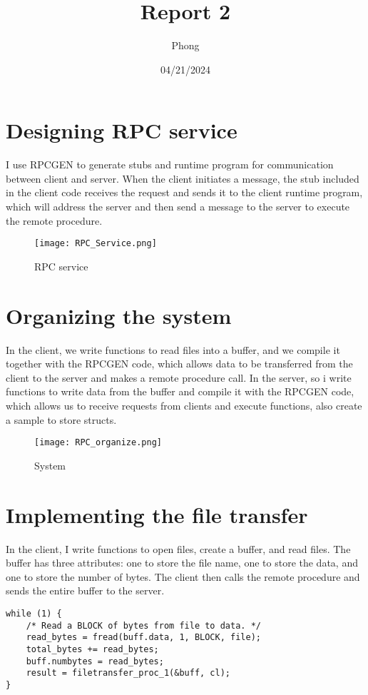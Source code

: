 \documentclass[12pt]{article}
\title{Report 2}
\author{Phong}
\date{04/21/2024}
\begin{document}
\maketitle

\section{Designing RPC service}
I use RPCGEN to generate stubs and runtime program for communication between client and server. When the client initiates a message, the stub included in the client code receives the request and sends it to the client runtime program, which will address the server and then send a message to the server to execute the remote procedure.

\begin{figure}[h]
    \centering
    \texttt{[image: RPC\_Service.png]}
    \caption{RPC service}
\end{figure}
  
\section{Organizing the system}
In the client, we write functions to read files into a buffer, and we compile it together with the RPCGEN code, which allows data to be transferred from the client to the server and makes a remote procedure call. In the server, so i write functions to write data from the buffer and compile it with the RPCGEN code, which allows us to receive requests from clients and execute functions, also create a sample to store structs.

\begin{figure}[h]
    \centering
    \texttt{[image: RPC\_organize.png]}
    \caption{System}
\end{figure}

\section{Implementing the file transfer}
In the client, I write functions to open files, create a buffer, and read files. The buffer has three attributes: one to store the file name, one to store the data, and one to store the number of bytes. The client then calls the remote procedure and sends the entire buffer to the server.

\begin{verbatim}
while (1) {
    /* Read a BLOCK of bytes from file to data. */
    read_bytes = fread(buff.data, 1, BLOCK, file);
    total_bytes += read_bytes;
    buff.numbytes = read_bytes;
    result = filetransfer_proc_1(&buff, cl);
}
\end{verbatim}
\end{document}
